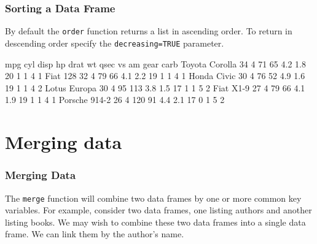 \documentclass[10pt,slidestop,mathserif,c]{beamer}
\begin{document}
\begin{frame}
	\frametitle{Sorting a Data Frame}

	By default the \texttt{order} function returns a list in ascending order. To return in descending order specify the \texttt{decreasing=TRUE} parameter.

\begin{Schunk}
\begin{Soutput}
               mpg cyl disp  hp drat  wt qsec vs am gear carb
Toyota Corolla  34   4   71  65  4.2 1.8   20  1  1    4    1
Fiat 128        32   4   79  66  4.1 2.2   19  1  1    4    1
Honda Civic     30   4   76  52  4.9 1.6   19  1  1    4    2
Lotus Europa    30   4   95 113  3.8 1.5   17  1  1    5    2
Fiat X1-9       27   4   79  66  4.1 1.9   19  1  1    4    1
Porsche 914-2   26   4  120  91  4.4 2.1   17  0  1    5    2
\end{Soutput}
\end{Schunk}

\end{frame}



\section{Merging data}

\begin{frame}
	\frametitle{Merging Data}
	
	The \texttt{merge} function will combine two data frames by one or more common key variables. For example, consider two data frames, one listing authors and another listing books. We may wish to combine these two data frames into a single data frame. We can link them by the author's name.
\end{frame}
\end{document}
